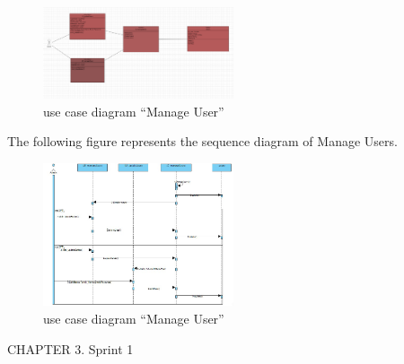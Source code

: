 \documentclass{article}
\begin{document}
{{{{{{{{\begin{figure}[htbp]
    \centering
    \includegraphics[width=0.5\textwidth]{DiagManageUser2}
    \caption{use case diagram “Manage User”}
    \label{fig:design2}
\end{figure}
The following figure represents the sequence diagram of Manage Users.\\
\begin{figure}[htbp]
    \centering
    \includegraphics[width=0.5\textwidth]{UserManageSeq}
    \caption{use case diagram “Manage User”}
    \label{fig:design2}
\end{figure}


















































\newpage
\noindent
CHAPTER 3.  Sprint 1 \\
\underline{\hspace{\textwidth}} \vspace{0.2cm}

}}}}}}}}
\end{document}
